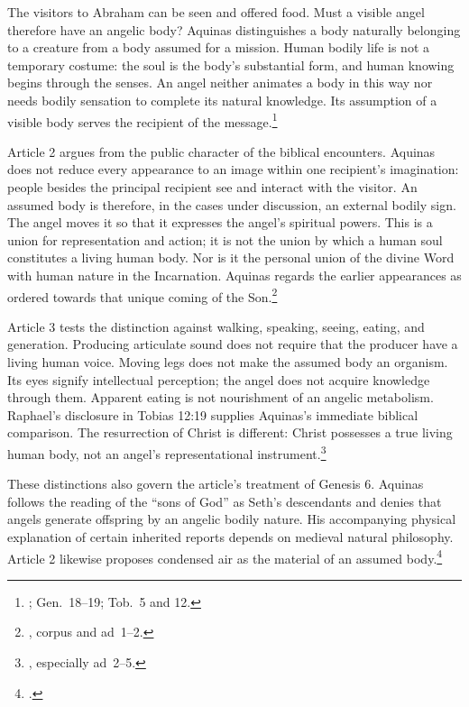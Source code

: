 The visitors to Abraham can be seen and offered food. Must a visible angel therefore have an angelic body? Aquinas distinguishes a body naturally belonging to a creature from a body assumed for a mission. Human bodily life is not a temporary costume: the soul is the body's substantial form, and human knowing begins through the senses. An angel neither animates a body in this way nor needs bodily sensation to complete its natural knowledge. Its assumption of a visible body serves the recipient of the message.\footnote{; Gen.~18--19; Tob.~5 and 12.}

Article 2 argues from the public character of the biblical encounters. Aquinas does not reduce every appearance to an image within one recipient's imagination: people besides the principal recipient see and interact with the visitor. An assumed body is therefore, in the cases under discussion, an external bodily sign. The angel moves it so that it expresses the angel's spiritual powers. This is a union for representation and action; it is not the union by which a human soul constitutes a living human body. Nor is it the personal union of the divine Word with human nature in the Incarnation. Aquinas regards the earlier appearances as ordered towards that unique coming of the Son.\footnote{, corpus and ad~1--2.}

Article 3 tests the distinction against walking, speaking, seeing, eating, and generation. Producing articulate sound does not require that the producer have a living human voice. Moving legs does not make the assumed body an organism. Its eyes signify intellectual perception; the angel does not acquire knowledge through them. Apparent eating is not nourishment of an angelic metabolism. Raphael's disclosure in Tobias 12:19 supplies Aquinas's immediate biblical comparison. The resurrection of Christ is different: Christ possesses a true living human body, not an angel's representational instrument.\footnote{, especially ad~2--5.}

These distinctions also govern the article's treatment of Genesis 6. Aquinas follows the reading of the ``sons of God'' as Seth's descendants and denies that angels generate offspring by an angelic bodily nature. His accompanying physical explanation of certain inherited reports depends on medieval natural philosophy. Article 2 likewise proposes condensed air as the material of an assumed body.\footnote{.}


